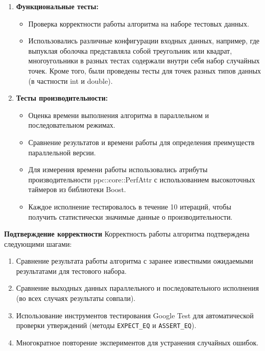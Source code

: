 \documentclass[a4paper,12pt]{article}
\begin{document}
\begin{enumerate}
\item\textbf{Функциональные тесты:}
\begin{itemize}
    \item Проверка корректности работы алгоритма на наборе тестовых данных. 
    \item Использовались различные конфигурации входных данных, например, где выпуклая оболочка представляла собой треугольник или квадрат, многоугольники в разных тестах содержали внутри себя набор случайных точек. Кроме того, были проведены тесты для точек разных типов данных (в частности int и double).

\end{itemize}

\item\textbf{Тесты производительности:}
\begin{itemize}
    \item Оценка времени выполнения алгоритма в параллельном и последовательном режимах.
    \item Сравнение результатов и времени работы для определения преимуществ параллельной версии.
    \item Для измерения времени работы использовались атрибуты производительности ppc::core::PerfAttr с использованием высокоточных таймеров из библиотеки Boost.
    \item Каждое исполнение тестировалось в течение 10 итераций, чтобы получить статистически значимые данные о производительности.
\end{itemize}
\end{enumerate}

\textbf{Подтверждение корректности}
Корректность работы алгоритма подтверждена следующими шагами:
\begin{enumerate}
    \item Сравнение результата работы алгоритма с заранее известными ожидаемыми результатами для тестового набора.
    \item Сравнение выходных данных параллельного и последовательного исполнения (во всех случаях результаты совпали).
    \item Использование инструментов тестирования Google Test для автоматической проверки утверждений (методы \texttt{EXPECT\_EQ} и \texttt{ASSERT\_EQ}).
    \item Многократное повторение экспериментов для устранения случайных ошибок.
\end{enumerate}
\end{document}
